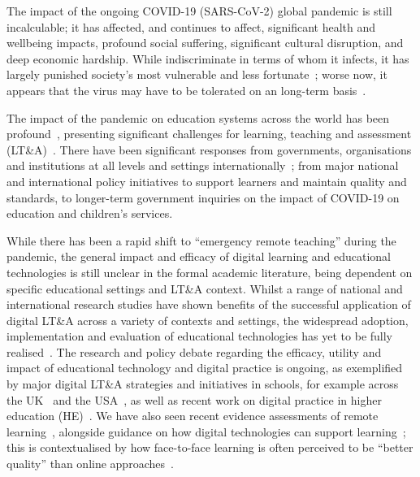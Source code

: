 \documentclass[conference]{IEEEtran}
\begin{document}
The impact of the ongoing COVID-19 (SARS-CoV-2) global pandemic is
still incalculable; it has affected, and continues to affect,
significant health and wellbeing impacts, profound social suffering,
significant cultural disruption, and deep economic hardship. While
indiscriminate in terms of whom it infects, it has largely punished
society’s most vulnerable and less
fortunate~\cite{vonbraun-et-al:2020,lancetcovid:2020,vanlancker+parolin:2020};
worse now, it appears that the virus may have to be tolerated on an
long-term basis~\cite{kissler-et-al:2020}.

The impact of the pandemic on education systems across the world has
been profound~\cite{unescocovidedu:2020,armitage+nellums:2020},
presenting significant challenges for learning, teaching and
assessment (LT\&A)~\cite{doucet-et-al:2020,oecd:2020,aace:2020}. There
have been significant responses from governments, organisations and
institutions at all levels and settings
internationally~\cite{who:2020}; from major national and international
policy initiatives to support learners and maintain quality and
standards, to longer-term government inquiries on the impact of
COVID-19 on education and children’s services.


While there has been a rapid shift to ``emergency remote teaching''
during the pandemic, the general impact and efficacy of digital
learning and educational technologies is still unclear in the formal
academic literature, being dependent on specific educational settings
and LT\&A context. Whilst a range of national and international
research studies have shown benefits of the successful application of
digital LT\&A across a variety of contexts and settings, the
widespread adoption, implementation and evaluation of educational
technologies has yet to be fully
realised~\cite{decodinglearning:2012,means:2014,ecjrc:2017,mayer:2018}.
The research and policy debate regarding the efficacy, utility and
impact of educational technology and digital practice is ongoing, as
exemplified by major digital LT\&A strategies and initiatives in
schools, for example across the
UK~\cite{digscot:2016,wgdcfguidance:2018,dfe:2019,crick:berari2020} and the
USA~\cite{usdoe:2020}, as well as recent work on digital practice in
higher education (HE)~\cite{jisc:2020,wef:2020,qaadigtaxonomy:2020}. We have also seen
recent evidence assessments of remote learning~\cite{eefremote:2020},
alongside guidance on how digital technologies can support
learning~\cite{eefdigtech:2019}; this is contextualised by how
face-to-face learning is often perceived to be ``better quality'' than
online approaches~\cite{paechter+maier:ihe2010,scbbcnews:2020}.
\end{document}
